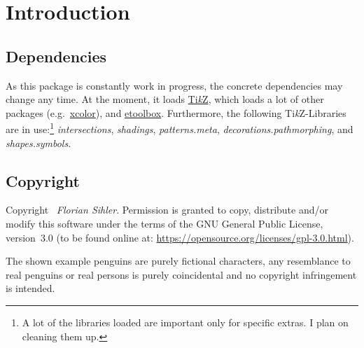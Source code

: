 \documentclass[parskip=half,english,numbers=noenddot,footnotes=nomultiple,oneside]{scrartcl}
\def\TikZ{Ti\textit{k}Z}
\begin{document}
\begin{center}
{}
\end{center}
\vfill\null

\clearpage\section{Introduction}
\subsection{Dependencies}

As this package is constantly work in progress, the concrete dependencies may change any time.
At the moment, it loads \href{https://www.ctan.org/pkg/pgf}{\TikZ}, which loads a lot of other packages (e.g.\ \href{https://www.ctan.org/pkg/xcolor}{xcolor}), and \href{https://www.ctan.org/pkg/etoolbox}{etoolbox}.
Furthermore, the following \TikZ-Libraries are in use:\footnote{A lot of the libraries loaded are important only for specific extras. I plan on cleaning them up.} \textit{intersections}, \textit{shadings}, \textit{patterns.meta}, \textit{decorations.pathmorphing}, and \textit{shapes.symbols}.

\subsection{Copyright}

Copyright \textcopyright\ \textit{Florian Sihler}. Permission is granted to copy, distribute and\slash or modify this software under the terms of the GNU General Public License, version~3.0 (to be found online at: \url{https://opensource.org/licenses/gpl-3.0.html}).

The shown example penguins are purely fictional characters, any resemblance to real penguins or real persons is purely coincidental and no copyright infringement is intended.
\end{document}
